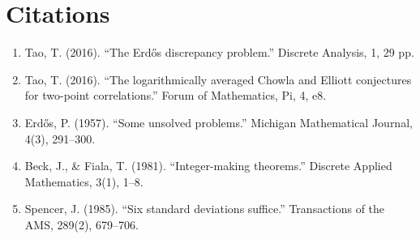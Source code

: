 \section{Citations}

\begin{enumerate}
\item Tao, T. (2016). ``The Erdős discrepancy problem.'' Discrete Analysis, 1, 29 pp.
\item Tao, T. (2016). ``The logarithmically averaged Chowla and Elliott conjectures for two-point correlations.'' Forum of Mathematics, Pi, 4, e8.
\item Erdős, P. (1957). ``Some unsolved problems.'' Michigan Mathematical Journal, 4(3), 291--300.
\item Beck, J., \& Fiala, T. (1981). ``Integer-making theorems.'' Discrete Applied Mathematics, 3(1), 1--8.
\item Spencer, J. (1985). ``Six standard deviations suffice.'' Transactions of the AMS, 289(2), 679--706.
\end{enumerate}
